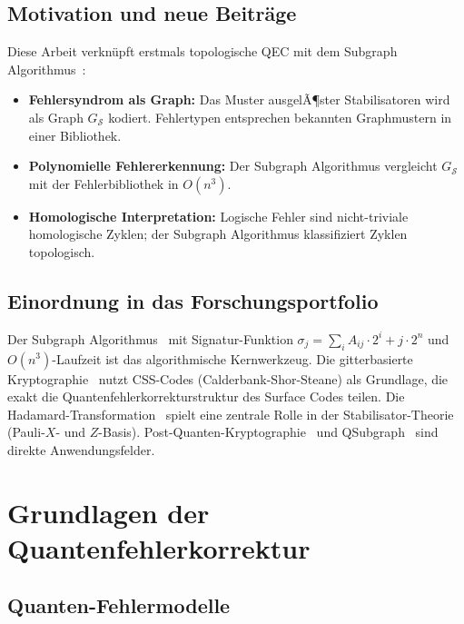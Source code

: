 ﻿\documentclass[a4paper,12pt]{article}
\theoremstyle{definition}
\begin{document}
\subsection{Motivation und neue Beitr\"age}

Diese Arbeit verkn\"upft erstmals topologische QEC mit dem
Subgraph Algorithmus~\cite{epp2026subgraph}:
\begin{itemize}
    \item \textbf{Fehlersyndrom als Graph:} Das Muster ausgelÃ¶ster
          Stabilisatoren wird als Graph $G_{\mathcal{S}}$ kodiert.
          Fehlertypen entsprechen bekannten Graphmustern in einer Bibliothek.
    \item \textbf{Polynomielle Fehlererkennung:} Der Subgraph Algorithmus
          vergleicht $G_{\mathcal{S}}$ mit der Fehlerbibliothek in $O(n^3)$.
    \item \textbf{Homologische Interpretation:} Logische Fehler sind
          nicht-triviale homologische Zyklen; der Subgraph Algorithmus
          klassifiziert Zyklen topologisch.
\end{itemize}

\subsection{Einordnung in das Forschungsportfolio}

Der Subgraph Algorithmus~\cite{epp2026subgraph} mit Signatur-Funktion
$\sigma_j = \sum_i A_{ij} \cdot 2^i + j \cdot 2^n$ und $O(n^3)$-Laufzeit
ist das algorithmische Kernwerkzeug.
Die gitterbasierte Kryptographie~\cite{epp2026lattice} nutzt CSS-Codes
(Calderbank-Shor-Steane) als Grundlage, die exakt die Quantenfehlerkorrekturstruktur
des Surface Codes teilen.
Die Hadamard-Transformation~\cite{epp2026hadamard} spielt eine zentrale Rolle
in der Stabilisator-Theorie (Pauli-$X$- und $Z$-Basis).
Post-Quanten-Kryptographie~\cite{epp2026pqc} und QSubgraph~\cite{epp2026qsubgraph}
sind direkte Anwendungsfelder.

\section{Grundlagen der Quantenfehlerkorrektur}

\subsection{Quanten-Fehlermodelle}
\end{document}
